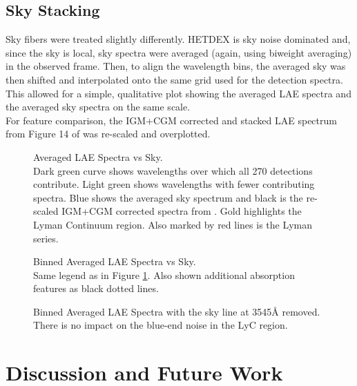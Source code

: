 \documentclass{aastex62}
\begin{document}
\subsection{Sky Stacking}

Sky fibers were treated slightly differently. HETDEX is sky noise dominated and, since the sky is local, sky spectra were averaged (again, using biweight averaging) in the observed frame. Then, to align the wavelength bins, the averaged sky was then shifted and interpolated onto the same grid used for the detection spectra. This allowed for a simple, qualitative plot showing the averaged LAE spectra and the averaged sky spectra on the same scale.\\

For feature comparison, the IGM+CGM corrected and stacked LAE spectrum from Figure 14 of \cite{Steidel} was re-scaled and overplotted. \\


\begin{figure}[H]
\caption{Averaged LAE Spectra vs Sky. \label{fig:biweight_unbinned}\\
Dark green curve shows wavelengths over which all 270 detections contribute. Light green shows wavelengths with fewer contributing spectra. Blue shows the averaged sky spectrum and black is the re-scaled IGM+CGM corrected spectra from \cite{Steidel}. Gold highlights the Lyman Continuum region. Also marked by red lines is the Lyman series.}
\end{figure}

\begin{figure}[H]
\caption{Binned Averaged LAE Spectra vs Sky.\label{fig:biweight_binned} \\
Same legend as in Figure \ref{fig:biweight_unbinned}. Also shown additional absorption features as black dotted lines.}
\end{figure}


\begin{figure}[H]
\caption{Binned Averaged LAE Spectra with the sky line at 3545$\mbox{\AA}$ removed. There is no impact on the blue-end noise in the LyC region.\label{fig:biweight_binned_no_skyline}}
\end{figure}


\section{Discussion and Future Work} \label{sec:discussion}
\end{document}
